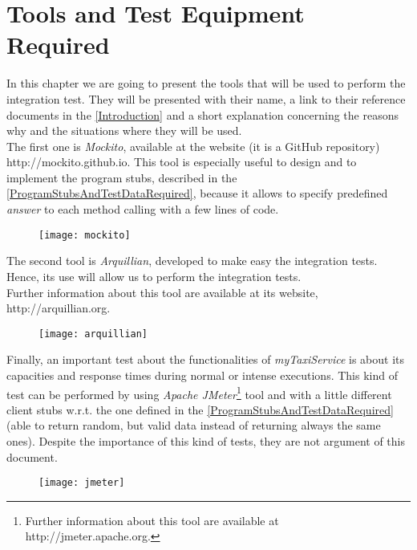 \documentclass[\mainpath/main]{subfiles}
\begin{document}
\chapter{Tools and Test Equipment Required} %
\label{ToolsAndTestEquipmentRequired}

\setmyfancystyle

In this chapter we are going to present the tools that will be used to perform the integration test. They will be presented with their name, a link to their reference documents in the \autoref{Introduction} and a short explanation concerning the reasons why and the situations where they will be used.\\
The first one is \textit{Mockito}, available at the website (it is a GitHub repository) http://mockito.github.io. This tool is especially useful to design and to implement the program stubs, described in the \autoref{ProgramStubsAndTestDataRequired}, because it allows to specify predefined \textit{answer} to each method calling with a few lines of code.

\begin{figure}[!ht]
	\centering
	\texttt{[image: mockito]}
\end{figure}

The second tool is \textit{Arquillian}, developed to make easy the integration tests. Hence, its use will allow us to perform the integration tests.\\
Further information about this tool are available at its website, \footnotesize{http://arquillian.org}.

\begin{figure}[!ht]
	\centering
	\texttt{[image: arquillian]}
\end{figure}

Finally, an important test about the functionalities of \textit{myTaxiService} is about its capacities and response times during normal or intense executions. This kind of test can be performed by using \textit{Apache JMeter}\footnote{Further information about this tool are available at http://jmeter.apache.org.} tool and with a little different client stubs w.r.t. the one defined in the \autoref{ProgramStubsAndTestDataRequired} (able to return random, but valid data instead of returning always the same ones). Despite the importance of this kind of tests, they are not argument of this document.

\begin{figure}[!ht]
	\centering
	\texttt{[image: jmeter]}
\end{figure}
\end{document}
